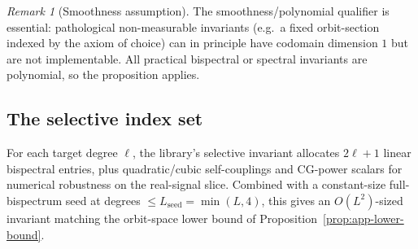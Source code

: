 \documentclass{article}
\theoremstyle{definition}
\theoremstyle{remark}
\newtheorem{remark}[theorem]{Remark}
\theoremstyle{definition}
\begin{document}
\begin{remark}[Smoothness assumption]
The smoothness/polynomial qualifier is essential: pathological
non-measurable invariants (e.g.\ a fixed orbit-section indexed by
the axiom of choice) can in principle have codomain dimension $1$
but are not implementable. All practical bispectral or spectral
invariants are polynomial, so the proposition applies.
\end{remark}

\subsection{The selective index set}
\label{sec:app-selective-index}

For each target degree $\ell$, the library's selective invariant
allocates $2\ell{+}1$ linear bispectral entries, plus quadratic/cubic
self-couplings and CG-power scalars for numerical robustness on the
real-signal slice. Combined with a constant-size full-bispectrum seed
at degrees $\le L_{\mathrm{seed}}=\min(L,4)$, this gives an
$O(L^2)$-sized invariant matching the orbit-space lower bound of
Proposition~\ref{prop:app-lower-bound}.
\end{document}
